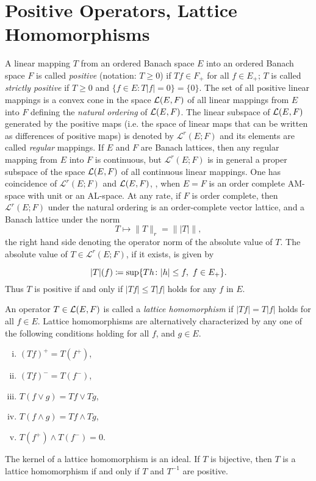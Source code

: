\section{Positive Operators, Lattice Homomorphisms}\label{sec:c1-6}
A linear mapping $ T $ from an ordered Banach space $ E $ into an ordered Banach space $ F $ is called \emph{positive} (notation: $ T \geq 0 $) if $ Tf \in F_{+} $ for all $ f \in E_{+} $; $ T $ is called \emph{strictly positive} if $ T \geq 0 $ and $ \{f \in E \colon T|f| = 0\} = \{0\} $.
The set of all positive linear mappings is a convex cone in the space $ \mathcal{L}(E,F) $ of all linear mappings from $ E $ into $ F $ defining the \emph{natural ordering} of $ \mathcal{L}(E,F) $.
The linear subspace of $ \mathcal{L}(E,F) $ generated by the positive maps (i.e. the space of linear maps that can be written as differences of positive maps) is denoted by $ \mathcal{L}^{r}(E;F) $ and its elements are called \emph{regular} mappings.
If $ E $ and $ F $ are Banach lattices, then any regular mapping from $ E $ into $ F $ is continuous, but  $ \mathcal{L}^{r}(E;F) $ is in general a proper subspace of the space $ \mathcal{L}(E,F) $ of all continuous linear mappings.
One has coincidence of $ \mathcal{L}^{r}(E;F) $ and $ \mathcal{L}(E,F) $, \eg, when $ E = F $ is an order complete AM-space with unit or an AL-space.
At any rate, if $ F $ is order complete, then $ \mathcal{L}^{r}(E;F) $ under the natural ordering is an order-complete vector lattice, and a Banach lattice under the norm
\[
	T \mapsto \|T\|_{r} = \| |T| \|,
\]
the right hand side denoting the operator norm of the absolute value of $ T $.
The absolute value of $ T \in  \mathcal{L}^{r}(E;F) $, if it exists, is given by

\[
	|T|(f) \coloneqq \sup\{ Th \colon |h| \leq f , \text{ $ f \in E_{+} $} \} . 
\]
Thus $ T $ is positive if and only if $ |Tf| \leq T|f| $ holds for any $ f $ in $ E $.

An operator $ T \in \mathcal{L}(E,F) $ is called a \emph{lattice homomorphism} if $ |Tf| = T|f| $ holds for all $ f \in E $.
Lattice homomorphisms are alternatively characterized by any one of the following conditions holding for all $ f $, and $ g \in E $.
\begin{enumerate}[(i)]

    \item 
    $(Tf)^{+} = T(f^{+})$,
    
    \item 
    $(Tf)^{-} = T(f^{-})$,
    
    \item 
    $T(f\vee g) = Tf\vee Tg$,
    
    \item 
    $T(f\wedge g) = Tf\wedge Tg$,
    
    \item 
    $T(f^{+})\wedge T(f^{-}) = 0$.

\end{enumerate}
The kernel of a lattice homomorphism is an ideal.
If $ T $ is bijective, then $ T $ is a lattice homomorphism if and only if $ T $ and $ T^{-1} $ are positive.
